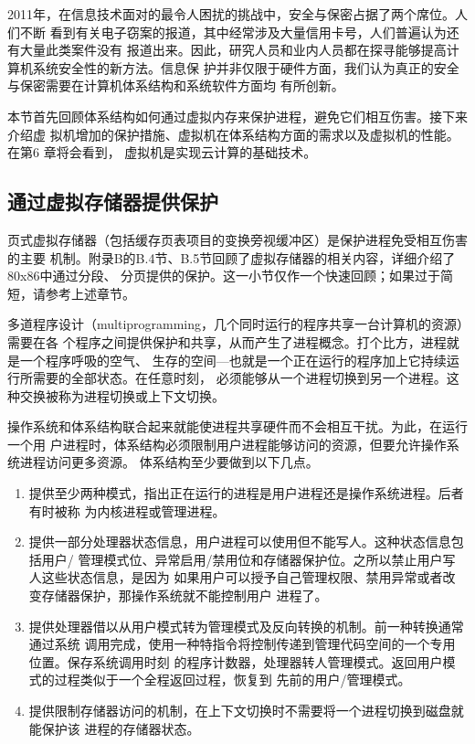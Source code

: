 2011年，在信息技术面对的最令人困扰的挑战中，安全与保密占据了两个席位。人们不断
看到有关电子窃案的报道，其中经常涉及大量信用卡号，人们普遍认为还有大量此类案件没有
报道出来。因此，研究人员和业内人员都在探寻能够提高计算机系统安全性的新方法。信息保
护并非仅限于硬件方面，我们认为真正的安全与保密需要在计算机体系结构和系统软件方面均
有所创新。

本节首先回顾体系结构如何通过虚拟内存来保护进程，避免它们相互伤害。接下来介绍虚
拟机增加的保护措施、虚拟机在体系结构方面的需求以及虚拟机的性能。在第6 章将会看到，
虚拟机是实现云计算的基础技术。

\subsection{通过虚拟存储器提供保护}
页式虚拟存储器（包括缓存页表项目的变换旁视缓冲区）是保护进程免受相互伤害的主要
机制。附录B的B.4节、B.5节回顾了虚拟存储器的相关内容，详细介绍了80x86中通过分段、
分页提供的保护。这一小节仅作一个快速回顾；如果过于简短，请参考上述章节。

多道程序设计（multiprogramming，几个同时运行的程序共享一台计算机的资源）需要在各
个程序之间提供保护和共享，从而产生了进程概念。打个比方，进程就是一个程序呼吸的空气、
生存的空间—也就是一个正在运行的程序加上它持续运行所需要的全部状态。在任意时刻，
必须能够从一个进程切换到另一个进程。这种交换被称为进程切换或上下文切换。

操作系统和体系结构联合起来就能使进程共享硬件而不会相互干扰。为此，在运行一个用
户进程时，体系结构必须限制用户进程能够访问的资源，但要允许操作系统进程访问更多资源。
体系结构至少要做到以下几点。

\begin{enumerate}
    \item 提供至少两种模式，指出正在运行的进程是用户进程还是操作系统进程。后者有时被称
    为内核进程或管理进程。
    \item 提供一部分处理器状态信息，用户进程可以使用但不能写人。这种状态信息包括用户/
    管理模式位、异常启用/禁用位和存储器保护位。之所以禁止用户写人这些状态信息，是因为
    如果用户可以授予自己管理权限、禁用异常或者改变存储器保护，那操作系统就不能控制用户
    进程了。
    \item 提供处理器借以从用户模式转为管理模式及反向转换的机制。前一种转换通常通过系统
    调用完成，使用一种特指令将控制传递到管理代码空间的一个专用位置。保存系统调用时刻
    的程序计数器，处理器转人管理模式。返回用户模式的过程类似于一个全程返回过程，恢复到
    先前的用户/管理模式。
    \item 提供限制存储器访问的机制，在上下文切换时不需要将一个进程切换到磁盘就能保护该
    进程的存储器状态。
\end{enumerate}

